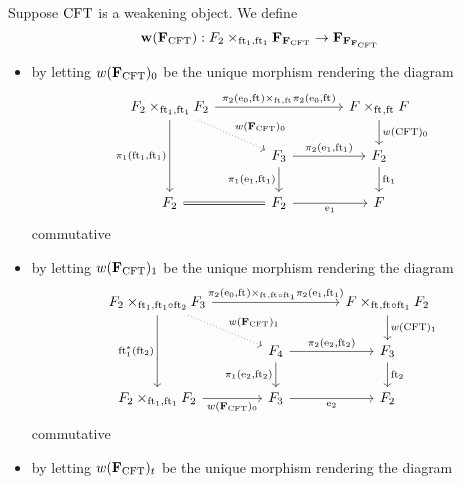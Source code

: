 \begin{defn}
Suppose $\mathrm{CFT}$ is a weakening object. We define
\begin{equation*}
\mathbf{w}(\famesys{\stesys}):\cobesys{\stesysf_2}{\famesys{\famesys{\stesys}}}{\eft[1]}{\eft[1]}\to\famesys{\famesys{\famesys{\stesys}}}
\end{equation*} 
\begin{itemize}
\item by letting $w(\mathbf{F}_{\mathrm{CFT}})_0$ be the unique morphism rendering the diagram
\begin{equation*}
\begin{tikzcd}[column sep=large]
\pullback{\stesysf_2}{\stesysf_2}{\eft[1]}{\eft[1]}
  \ar{rr}{\pullback{\pullbackpr{2}{\ectxext}{\eft}}{\pullbackpr{2}{\ectxext}{\eft}}{\eft}{\eft}}
  \ar[dotted]{dr}{w(\famesys{\stesys})_0}
  \ar{dd}[swap]{\pullbackpr{1}{\eft[1]}{\eft[1]}}
  & &
\pullback{\stesysf}{\stesysf}{\eft}{\eft}
  \ar{d}{w(\stesys)_0}
  \\
  {}&
\stesysf_3
  \ar{r}{\pullbackpr{2}{\efamext}{\eft[1]}}
  \ar{d}[swap]{\pullbackpr{1}{\efamext}{\eft[1]}}
  &
\stesysf_2
  \ar{d}{\eft[1]}
  \\
\stesysf_2
  \ar[equals]{r}
  &
\stesysf_2
  \ar{r}[swap]{\efamext}
  &
\stesysf
\end{tikzcd}
\end{equation*}
commutative
\item by letting $w(\mathbf{F}_{\mathrm{CFT}})_1$ be the unique morphism rendering the diagram
\begin{equation*}
\begin{tikzcd}[column sep=large]
\pullback{\stesysf_2}{\stesysf_3}{\eft[1]}{\eft[1]\circ\eft[2]}
  \ar{rr}{\pullback{\pullbackpr{2}{\ectxext}{\eft}}{\pullbackpr{2}{\efamext}{\eft[1]}}{\eft}{\eft\circ\eft[1]}}
  \ar[dotted]{dr}{w(\famesys{\stesys})_1}
  \ar{dd}[swap]{\eft[1]^\ast(\eft[2])}
  & &
\pullback{\stesysf}{\stesysf_2}{\eft}{\eft\circ\eft[1]}
  \ar{d}{w(\stesys)_1}
  \\
  {}&
\stesysf_4
  \ar{r}{\pullbackpr{2}{\eext{2}}{\eft[2]}}
  \ar{d}[swap]{\pullbackpr{1}{\eext{2}}{\eft[2]}}
  &
\stesysf_3
  \ar{d}{\eft[2]}
  \\
\pullback{\stesysf_2}{\stesysf_2}{\eft[1]}{\eft[1]}
  \ar{r}[swap]{w(\famesys{\stesys})_0}
  &
\stesysf_3
  \ar{r}[swap]{\eext{2}}
  &
\stesysf_2
\end{tikzcd}
\end{equation*}
commutative
\item by letting $w(\mathbf{F}_{\mathrm{CFT}})_t$ be the unique morphism rendering the diagram

\end{itemize}
\end{defn}
